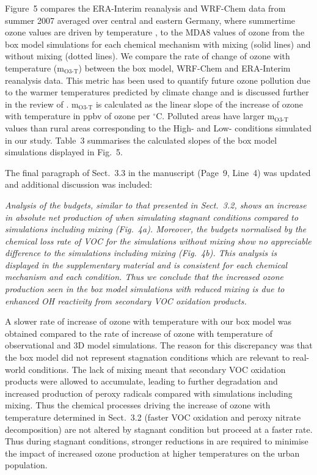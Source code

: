 \documentclass{article}
\DeclareRobustCommand*\degree{\ensuremath{^{\circ}}}
\begin{document}
{Figure~5 compares the ERA-Interim reanalysis and WRF-Chem data from summer 2007 averaged over central and eastern Germany, where summertime ozone values are driven by temperature \citep{Otero:2016}, to the MDA8 values of ozone from the box model simulations for each chemical mechanism with mixing (solid lines) and without mixing (dotted lines).
We compare the rate of change of ozone with temperature (m$_{\text{O3-T}}$) between the box model, WRF-Chem and ERA-Interim reanalysis data.
This metric has been used to quantify future ozone pollution due to the warmer temperatures predicted by climate change \citep{Dawson:2007, Rasmussen:2013} and is discussed further in the review of \citet{Pusede:2015}.
m$_{\text{O3-T}}$ is calculated as the linear slope of the increase of ozone with temperature in ppbv of ozone per \degree C.
Polluted areas have larger m$_{\text{O3-T}}$ values than rural areas corresponding to the High- and Low- conditions simulated in our study.  
Table~3 summarises the calculated slopes of the box model simulations displayed in Fig.~5.
}

The final paragraph of Sect.~3.3 in the manuscript (Page~9, Line~4) was updated and additional discussion was included:
{\itshape
Analysis of the  budgets, similar to that presented in Sect.~3.2, shows an increase in absolute net production of  when simulating stagnant conditions compared to simulations including mixing (Fig.~4a).
Moreover, the  budgets normalised by the chemical loss rate of VOC for the simulations without mixing show no appreciable difference to the simulations including mixing (Fig.~4b).
This analysis is displayed in the supplementary material and is consistent for each chemical mechanism and each  condition.
Thus we conclude that the increased ozone production seen in the box model simulations with reduced mixing is due to enhanced OH reactivity from secondary VOC oxidation products.

A slower rate of increase of ozone with temperature with our box model was obtained compared to the rate of increase of ozone with temperature of observational and 3D model simulations.
The reason for this discrepancy was that the box model did not represent stagnation conditions which are relevant to real-world conditions.
The lack of mixing meant that secondary VOC oxidation products were allowed to accumulate, leading to further degradation and increased production of peroxy radicals compared with simulations including mixing. 
Thus the chemical processes driving the increase of ozone with temperature determined in Sect.~3.2 (faster VOC oxidation and peroxy nitrate decomposition) are not altered by stagnant condition but proceed at a faster rate.
Thus during stagnant conditions, stronger reductions in  are required to minimise the impact of increased ozone production at higher temperatures on the urban population.
}
\end{document}
